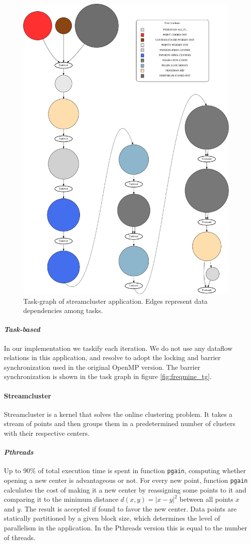 {\begin{figure}[ht!]%
	\center
	\includegraphics[width=.6\columnwidth]{ifcg/figures/streamcluster_taskgraph}%
	\caption{Task-graph of streamcluster application.  Edges represent data dependencies among
tasks.}
	\label{fig:streamcluster_tg}%
	\vspace{.5cm}
\end{figure}



\paragraph{\textit{Task-based}}
In our implementation we taskify each iteration. We do not use any dataflow relations in this application, and resolve to 
adopt the locking and barrier synchronization used in the original OpenMP version.
The barrier synchronization is shown in the task graph in figure \ref{fig:freqmine_tg}.

\paragraph{\textbf{Streamcluster}}
Streamcluster is a kernel that solves the online clustering problem. 
It takes a stream of points and then groups them in a predetermined number of clusters with their respective centers.  


\paragraph{\textit{Pthreads}}
Up to 90\% of total execution time is spent in function \texttt{pgain}, 
computing whether opening a new center is advantageous or not.  For every 
new point, function \texttt{pgain} calculates the cost of making it a new center by reassigning some points to it and 
comparing it to the minimum distance $d(x,y) = |{x-y}|^2$ between all points $x$ and $y$.
The result is accepted if found to favor the new center.  Data points are statically partitioned by a given block 
size, which determines the level of parallelism in the application. In the Pthreads version this is equal to the number of
threads. 

}
